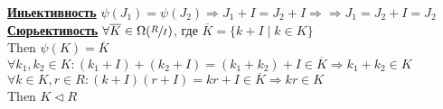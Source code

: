 \documentclass[12pt]{article}
\begin{document}
\textbf{\underline{Иньективность}} $ \psi(J_1) = \psi(J_2) \Rightarrow J_1 + I = J_2 + I
\Rightarrow \Rightarrow J_1 = J_2 + I = J_2$ \\

\textbf{\underline{Сюрьективость}} $\forall \overline{K} \in \Omega(\sfrac{R}{I})$, где $\overline{K}
= \{ k + I \; |\; k\in K \}$\\
Then $\psi(K) = \overline{K} $ \\
$ \forall k_1, k_2 \in K: (k_1 + I) + (k_2 + I) = (k_1 + k_2) + I \in \overline{K} 
\Rightarrow k_1 + k_2 \in K$ \\
$ \forall k\in K, r \in R: (k+I)(r+I) = kr + I \in \overline{K} \Rightarrow
kr \in K $ \\
Then $K \lhd R$
\end{document}
